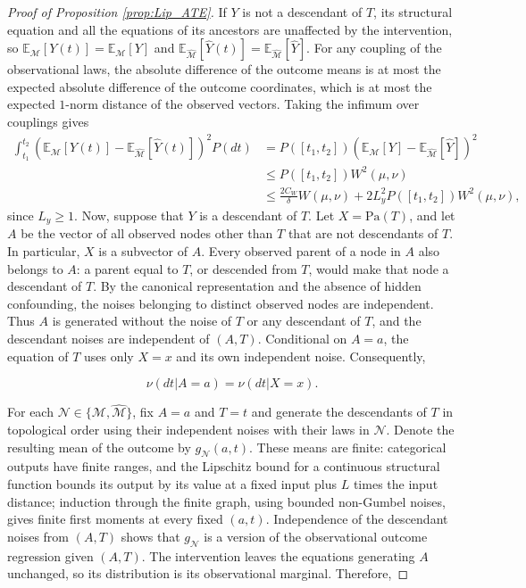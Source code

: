 \begin{proof}[Proof of Proposition \ref{prop:Lip_ATE}]
If $Y$ is not a descendant of $T$, its structural equation and all the equations of its ancestors are unaffected by the intervention, so $\mathbb{E}_{\mathcal{M}}[Y(t)]=\mathbb{E}_{\mathcal{M}}[Y]$ and $\mathbb{E}_{\hat{\mathcal{M}}}[\hat{Y}(t)]=\mathbb{E}_{\hat{\mathcal{M}}}[\hat{Y}]$. For any coupling of the observational laws, the absolute difference of the outcome means is at most the expected absolute difference of the outcome coordinates, which is at most the expected $1$-norm distance of the observed vectors. Taking the infimum over couplings gives
\begin{align*}
\int_{t_1}^{t_2}(\mathbb{E}_{\mathcal{M}}[Y(t)]-\mathbb{E}_{\hat{\mathcal{M}}}[\hat{Y}(t)])^2P(dt)
&=P([t_1,t_2])(\mathbb{E}_{\mathcal{M}}[Y]-\mathbb{E}_{\hat{\mathcal{M}}}[\hat{Y}])^2\\
&\leqslant P([t_1,t_2])W^2(\mu,\nu)\\
&\leqslant\frac{2C_W}{\delta}W(\mu,\nu)+2L_y^2P([t_1,t_2])W^2(\mu,\nu),
\end{align*}
since $L_y\geqslant1$.
Now, suppose that $Y$ is a descendant of $T$. Let $X=\text{Pa}(T)$, and let $A$ be the vector of all observed nodes other than $T$ that are not descendants of $T$. In particular, $X$ is a subvector of $A$. Every observed parent of a node in $A$ also belongs to $A$: a parent equal to $T$, or descended from $T$, would make that node a descendant of $T$. By the canonical representation and the absence of hidden confounding, the noises belonging to distinct observed nodes are independent. Thus $A$ is generated without the noise of $T$ or any descendant of $T$, and the descendant noises are independent of $(A,T)$. Conditional on $A=a$, the equation of $T$ uses only $X=x$ and its own independent noise. Consequently,

\[
\nu(dt|A=a)=\nu(dt|X=x).
\]

For each $\mathcal{N}\in\{\mathcal{M},\hat{\mathcal{M}}\}$, fix $A=a$ and $T=t$ and generate the descendants of $T$ in topological order using their independent noises with their laws in $\mathcal{N}$. Denote the resulting mean of the outcome by $g_{\mathcal{N}}(a,t)$. These means are finite: categorical outputs have finite ranges, and the Lipschitz bound for a continuous structural function bounds its output by its value at a fixed input plus $L$ times the input distance; induction through the finite graph, using bounded non-Gumbel noises, gives finite first moments at every fixed $(a,t)$. Independence of the descendant noises from $(A,T)$ shows that $g_{\mathcal{N}}$ is a version of the observational outcome regression given $(A,T)$. The intervention leaves the equations generating $A$ unchanged, so its distribution is its observational marginal. Therefore,


\end{proof}

